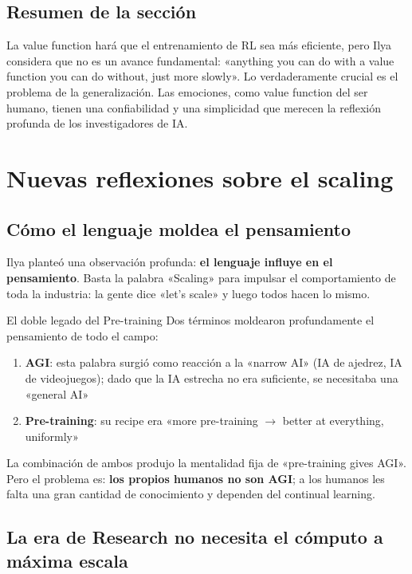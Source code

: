 \documentclass[a4paper]{article}
\begin{document}
\subsection{Resumen de la sección}

La value function hará que el entrenamiento de RL sea más eficiente, pero Ilya considera que no es un avance fundamental: «anything you can do with a value function you can do without, just more slowly». Lo verdaderamente crucial es el problema de la generalización. Las emociones, como value function del ser humano, tienen una confiabilidad y una simplicidad que merecen la reflexión profunda de los investigadores de IA.

\section{Nuevas reflexiones sobre el scaling}

\subsection{Cómo el lenguaje moldea el pensamiento}

Ilya planteó una observación profunda: \textbf{el lenguaje influye en el pensamiento}. Basta la palabra «Scaling» para impulsar el comportamiento de toda la industria: la gente dice «let's scale» y luego todos hacen lo mismo.

\begin{importantbox}{El doble legado del Pre-training}
Dos términos moldearon profundamente el pensamiento de todo el campo:
\begin{enumerate}
    \item \textbf{AGI}: esta palabra surgió como reacción a la «narrow AI» (IA de ajedrez, IA de videojuegos); dado que la IA estrecha no era suficiente, se necesitaba una «general AI»
    \item \textbf{Pre-training}: su recipe era «more pre-training $\rightarrow$ better at everything, uniformly»
\end{enumerate}
La combinación de ambos produjo la mentalidad fija de «pre-training gives AGI». Pero el problema es: \textbf{los propios humanos no son AGI}; a los humanos les falta una gran cantidad de conocimiento y dependen del continual learning.
\end{importantbox}

\subsection{La era de Research no necesita el cómputo a máxima escala}
\end{document}
